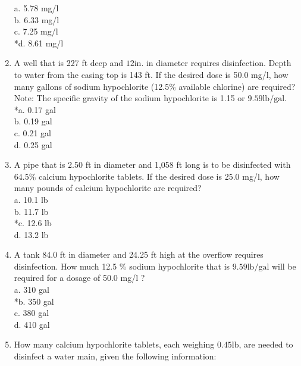\begin{enumerate}
a. 5.78 mg/l\\
b. 6.33 mg/l\\
c. 7.25 mg/l\\
*d. 8.61 mg/l\\
  \item A well that is 227 ft deep and $12 \mathrm{in}$. in diameter requires disinfection. Depth to water from the casing top is 143 ft. If the desired dose is 50.0 mg/l, how many gallons of sodium hypochlorite (12.5\% available chlorine) are required? Note: The specific gravity of the sodium hypochlorite is 1.15 or $9.59 \mathrm{lb} / \mathrm{gal}$.\\
*a. 0.17 gal\\
b. 0.19 gal\\
c. 0.21 gal\\
d. 0.25 gal \\
  \item A pipe that is 2.50 ft in diameter and 1,058 ft long is to be disinfected with $64.5 \%$ calcium hypochlorite tablets. If the desired dose is 25.0 mg/l, how many pounds of calcium hypochlorite are required?\\
a. 10.1 lb\\
b. 11.7 lb\\
*c. 12.6 lb\\
d. 13.2 lb\\
  \item A tank 84.0 ft in diameter and 24.25 ft high at the overflow requires disinfection. How much 12.5 \% sodium hypochlorite that is $9.59 \mathrm{lb} / \mathrm{gal}$ will be required for a dosage of 50.0 mg/l ?\\
a. 310 gal\\
*b. 350 gal\\
c. 380 gal\\
d. 410 gal\\
  \item How many calcium hypochlorite tablets, each weighing $0.45 \mathrm{lb}$, are needed to disinfect a water main, given the following information:\\


\end{enumerate}
